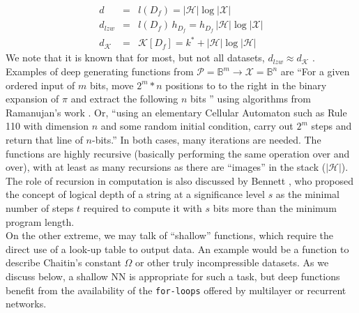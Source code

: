 \documentclass[11pt]{amsart}
\newcommand{\inputspace}{\mathcal X}
\newcommand{\handspace}{\mathcal H}
\begin{document}
\begin{eqnarray*}
d &=& l(D_{f}) = |\handspace| \log |\inputspace| \\
  d_{lzw}&=& l(D_{f}) \, h_{D_{f}} =  h_{D_{f}}\, |\handspace| \log |\inputspace|  \\
  d_{\mathcal K}&=& \mathcal K[D_{f}] = k^{*} +  |\handspace| \log |\handspace|
\end{eqnarray*}
We note that it is known that for most, but not all datasets, $d_{lzw} \approx d_{\mathcal K}$ \cite{Cover:2006aa}.
Examples of deep generating functions from $\mathcal P = \mathbb B ^{m} \rightarrow \inputspace = \mathbb B ^{n}$ are ``For a given ordered input of $m$ bits, move $2^{m} * n$ positions to to the right  in the binary expansion of $\pi$ and extract the following $n$ bits '' using algorithms from Ramanujan's work \cite{Borwein:1989aa}. Or, ``using an elementary Cellular Automaton such as Rule 110 \cite{Wolfram:2002aa} with dimension $n$ and some random initial condition, carry out $2^{m}$ steps and return that line of $n$-bits.''  In both cases, many iterations are needed. The functions are highly recursive (basically performing the same operation over and over), with at least as many recursions as there are ``images'' in the stack ($ |\handspace|$).  The role of recursion in computation is also discussed by Bennett \cite{Bennet:1988aa}, who proposed the concept of logical depth of a string at a significance level $s$ as the minimal number of steps $t$ required to compute it with $s$ bits more than the minimum program length. \\

On the other extreme, we may talk of ``shallow'' functions, which require the direct use of a look-up table to output data. An example would be a function to describe Chaitin's constant  $\Omega$ or other truly incompressible datasets.  As we discuss below, a shallow NN is appropriate for such a task, but deep functions benefit from the availability of the {\tt for-loops} offered by multilayer or recurrent networks.\\


\end{document}
